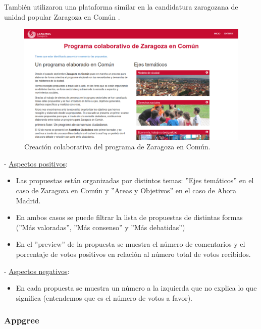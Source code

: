 También utilizaron una plataforma similar en la candidatura zaragozana de unidad popular Zaragoza en Común \cite{ref:ganemosZaragoza}.

\begin{figure}[!]
\centering
\includegraphics[keepaspectratio, scale=0.30]{Media/Captures/programaColaborativoGanemosZaragoza.png}
\caption{Creación colaborativa del programa de Zaragoza en Común.}
\label{fig:programaZaragozaEnComun}
\end{figure}

 - \underline{Aspectos positivos}:

\begin{itemize}
	\item Las propuestas están organizadas por distintos temas: ''Ejes temáticos'' en el caso de Zaragoza en Común y ''Areas y Objetivos'' en el caso de Ahora Madrid.
	\item En ambos casos se puede filtrar la lista de propuestas de distintas formas (''Más valoradas'', ''Más consenso'' y ''Más debatidas'') 
	\item En el ''preview'' de la propuesta se muestra el número de comentarios y el porcentaje de votos positivos en relación al número total de votos recibidos.
\end{itemize}

 - \underline{Aspectos negativos}:

\begin{itemize}
	\item En cada propuesta se muestra un número a la izquierda que no explica lo que significa (entendemos que es el número de votos a favor).
\end{itemize}

\subsubsection{Appgree}

